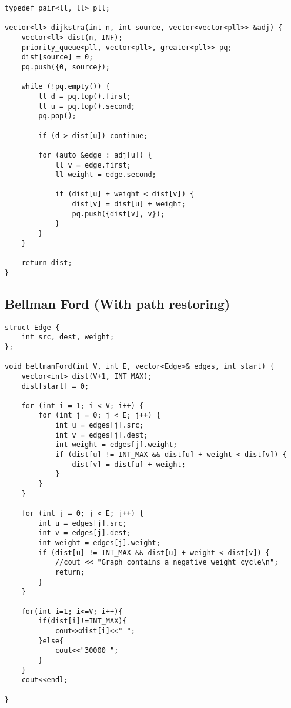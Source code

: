 \documentclass[10pt]{article}
\begin{document}
\begin{multicols*}{2}
\begin{lstlisting}[style=compactcpp]
typedef pair<ll, ll> pll;
 
vector<ll> dijkstra(int n, int source, vector<vector<pll>> &adj) {
    vector<ll> dist(n, INF);
    priority_queue<pll, vector<pll>, greater<pll>> pq; 
    dist[source] = 0;
    pq.push({0, source}); 

    while (!pq.empty()) {
        ll d = pq.top().first; 
        ll u = pq.top().second; 
        pq.pop();

        if (d > dist[u]) continue;

        for (auto &edge : adj[u]) {
            ll v = edge.first;
            ll weight = edge.second; 

            if (dist[u] + weight < dist[v]) { 
                dist[v] = dist[u] + weight;
                pq.push({dist[v], v}); 
            }
        }
    }

    return dist;
}
\end{lstlisting}

\subsection{Bellman Ford (With path restoring)}

\begin{lstlisting}[style=compactcpp]
struct Edge {
    int src, dest, weight;
};

void bellmanFord(int V, int E, vector<Edge>& edges, int start) {
    vector<int> dist(V+1, INT_MAX);
    dist[start] = 0;

    for (int i = 1; i < V; i++) {
        for (int j = 0; j < E; j++) {
            int u = edges[j].src;
            int v = edges[j].dest;
            int weight = edges[j].weight;
            if (dist[u] != INT_MAX && dist[u] + weight < dist[v]) {
                dist[v] = dist[u] + weight;
            }
        }
    }

    for (int j = 0; j < E; j++) {
        int u = edges[j].src;
        int v = edges[j].dest;
        int weight = edges[j].weight;
        if (dist[u] != INT_MAX && dist[u] + weight < dist[v]) {
            //cout << "Graph contains a negative weight cycle\n";
            return;
        }
    }

    for(int i=1; i<=V; i++){
        if(dist[i]!=INT_MAX){
            cout<<dist[i]<<" ";
        }else{
            cout<<"30000 ";
        }
    }
    cout<<endl;

}


\end{lstlisting}
\end{multicols*}
\end{document}
